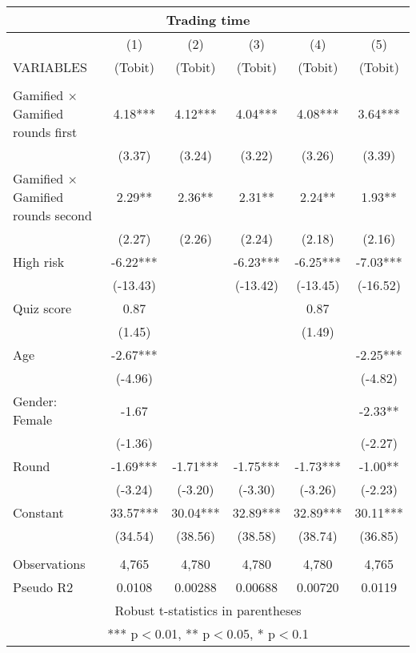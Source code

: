 \documentclass[]{article}
\begin{document}
\begin{tabular}{lccccc}
\multicolumn{6}{c}{Trading time} \\ \hline
 & (1) & (2) & (3) & (4) & (5) \\
VARIABLES & (Tobit) & (Tobit) & (Tobit) & (Tobit) & (Tobit) \\ \hline
 &  &  &  &  &  \\
Gamified $\times$ Gamified rounds first & 4.18*** & 4.12*** & 4.04*** & 4.08*** & 3.64*** \\
 & (3.37) & (3.24) & (3.22) & (3.26) & (3.39) \\
Gamified $\times$ Gamified rounds second & 2.29** & 2.36** & 2.31** & 2.24** & 1.93** \\
 & (2.27) & (2.26) & (2.24) & (2.18) & (2.16) \\
High risk & -6.22*** &  & -6.23*** & -6.25*** & -7.03*** \\
 & (-13.43) &  & (-13.42) & (-13.45) & (-16.52) \\
Quiz score & 0.87 &  &  & 0.87 &  \\
 & (1.45) &  &  & (1.49) &  \\
Age & -2.67*** &  &  &  & -2.25*** \\
 & (-4.96) &  &  &  & (-4.82) \\
Gender: Female & -1.67 &  &  &  & -2.33** \\
 & (-1.36) &  &  &  & (-2.27) \\
Round & -1.69*** & -1.71*** & -1.75*** & -1.73*** & -1.00** \\
 & (-3.24) & (-3.20) & (-3.30) & (-3.26) & (-2.23) \\
Constant & 33.57*** & 30.04*** & 32.89*** & 32.89*** & 30.11*** \\
 & (34.54) & (38.56) & (38.58) & (38.74) & (36.85) \\
 &  &  &  &  &  \\
Observations & 4,765 & 4,780 & 4,780 & 4,780 & 4,765 \\
 Pseudo R2 & 0.0108 & 0.00288 & 0.00688 & 0.00720 & 0.0119 \\ \hline
\multicolumn{6}{c}{ Robust t-statistics in parentheses} \\
\multicolumn{6}{c}{ *** p$<$0.01, ** p$<$0.05, * p$<$0.1} \\
\end{tabular}
\end{document}
